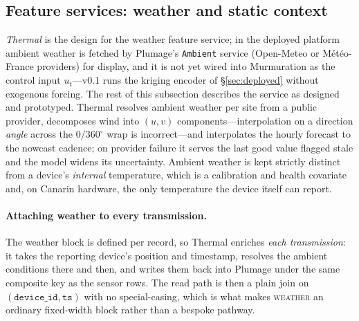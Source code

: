 \documentclass[10pt]{article}
\begin{document}
\subsection{Feature services: weather and static context}
\label{sec:thermal}
\emph{Thermal} is the design for the weather feature service; in the deployed
platform ambient weather is fetched by Plumage's \texttt{Ambient} service
(Open-Meteo or M\'et\'eo-France providers) for display, and it is not yet wired
into Murmuration as the control input $u_t$---v0.1 runs the kriging encoder of
\S\ref{sec:deployed} without exogenous forcing. The rest of this subsection
describes the service as designed and prototyped. Thermal resolves ambient
weather per site from a public provider,
decomposes wind into $(u,v)$ components---interpolation on a direction
\emph{angle} across the $0/360^\circ$ wrap is incorrect---and interpolates the
hourly forecast to the nowcast cadence; on provider failure it serves the last
good value flagged stale and the model widens its uncertainty. Ambient weather is
kept strictly distinct from a device's \emph{internal} temperature, which is a
calibration and health covariate and, on Canarin hardware, the only temperature the
device itself can report.

\paragraph{Attaching weather to every transmission.}
The weather block is defined per record, so Thermal enriches \emph{each
transmission}: it takes the reporting device's position and timestamp, resolves the
ambient conditions there and then, and writes them back into Plumage under the same
composite key as the sensor rows. The read path is then a plain join on
$(\texttt{device\_id},\texttt{ts})$ with no special-casing, which is what makes
\textsc{weather} an ordinary fixed-width block rather than a bespoke pathway.
\end{document}
